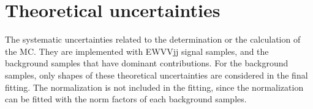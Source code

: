 

\section{Theoretical uncertainties}
The systematic uncertainties related to the determination or the calculation of the MC.
They are implemented with EWVVjj signal samples, and the background samples that have dominant contributions. For the background samples, only shapes of these theoretical uncertainties are considered in the final fitting. The normalization is not included in the fitting, since the normalization can be fitted with the norm factors of each background samples.
